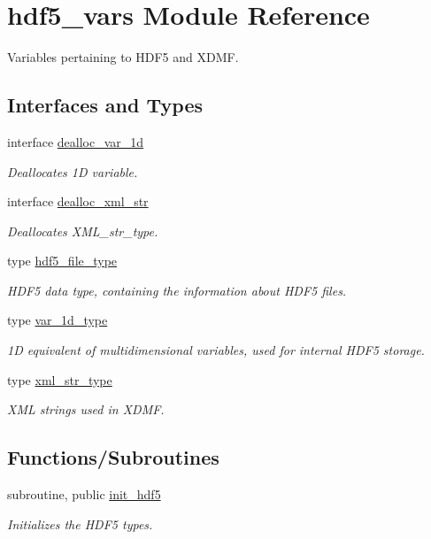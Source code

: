 \hypertarget{namespacehdf5__vars}{}\section{hdf5\+\_\+vars Module Reference}
\label{namespacehdf5__vars}


Variables pertaining to H\+D\+F5 and X\+D\+MF.  


\subsection*{Interfaces and Types}
\begin{DoxyCompactItemize}
\item 
interface \hyperlink{interfacehdf5__vars_1_1dealloc__var__1d}{dealloc\+\_\+var\+\_\+1d}
\begin{DoxyCompactList}\small\item\em Deallocates 1D variable. \end{DoxyCompactList}\item 
interface \hyperlink{interfacehdf5__vars_1_1dealloc__xml__str}{dealloc\+\_\+xml\+\_\+str}
\begin{DoxyCompactList}\small\item\em Deallocates X\+M\+L\+\_\+str\+\_\+type. \end{DoxyCompactList}\item 
type \hyperlink{structhdf5__vars_1_1hdf5__file__type}{hdf5\+\_\+file\+\_\+type}
\begin{DoxyCompactList}\small\item\em H\+D\+F5 data type, containing the information about H\+D\+F5 files. \end{DoxyCompactList}\item 
type \hyperlink{structhdf5__vars_1_1var__1d__type}{var\+\_\+1d\+\_\+type}
\begin{DoxyCompactList}\small\item\em 1D equivalent of multidimensional variables, used for internal H\+D\+F5 storage. \end{DoxyCompactList}\item 
type \hyperlink{structhdf5__vars_1_1xml__str__type}{xml\+\_\+str\+\_\+type}
\begin{DoxyCompactList}\small\item\em X\+ML strings used in X\+D\+MF. \end{DoxyCompactList}\end{DoxyCompactItemize}
\subsection*{Functions/\+Subroutines}
\begin{DoxyCompactItemize}
\item 
subroutine, public \hyperlink{namespacehdf5__vars_ab644703bcb67ce423732e39ab56a4b63}{init\+\_\+hdf5}
\begin{DoxyCompactList}\small\item\em Initializes the H\+D\+F5 types. \end{DoxyCompactList}\end{DoxyCompactItemize}
